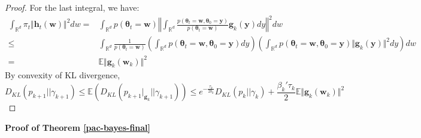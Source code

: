 \documentclass[final,12pt]{colt2018} %
\begin{document}
\begin{proof}
For the last integral, we have:
\begin{equation}
  \begin{split}
  \int_{\mathbb{R}^d} \pi_t \Vert \bm{h}_t(\bm{w})\Vert^2dw=&\int_{\mathbb{R}^d} p(\bm{\theta}_t=\bm{w}) \left\Vert \int_{\mathbb{R}^d}\frac{p(\bm{\theta}_t=\bm{w},\bm{\theta}_0=\bm{y})}{p(\bm{\theta}_t=\bm{w})}\bm{g}_k(\bm{y})dy\right\Vert^2dw\\
  \leq& \int_{\mathbb{R}^d} \frac{1}{p(\bm{\theta}_t=\bm{w})} \left(\int_{\mathbb{R}^d}p(\bm{\theta}_t=\bm{w},\bm{\theta}_0=\bm{y})dy\right)\left(\int_{\mathbb{R}^d}p(\bm{\theta}_t=\bm{w},\bm{\theta}_0=\bm{y})\Vert\bm{g}_k(\bm{y})\Vert^2dy\right)dw\\
  =&\mathbb{E} \Vert \bm{g}_k(\bm{w}_k)\Vert^2
  \end{split}
\end{equation}
By convexity of KL divergence,
\begin{equation}
	D_{KL}\left(p_{k+1}\Big|\Big|\gamma_{k+1}\right)\leq \mathbb{E}\left(D_{KL}\left(p_{k+1}|_{\bm{g}_k}\Big|\Big|\gamma_{k+1}\right)\right)\leq e^{-\frac{\tau_k}{2b_k}}D_{KL}\left(p_{k}\big|\big|\gamma_{k}\right)+\frac{\beta_k'\tau_k}{2}\mathbb{E} \Vert \bm{g}_k(\bm{w}_k)\Vert^2
\end{equation}
\end{proof}


\noindent \textbf{Proof of Theorem \ref{pac-bayes-final}}
\end{document}
